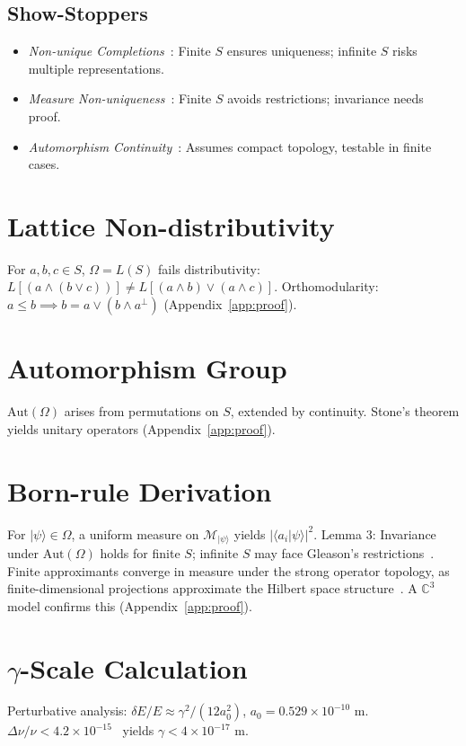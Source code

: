 \documentclass[aps,prx,twocolumn]{revtex4-2}
\begin{document}
\subsection{Show-Stoppers}
\begin{itemize}
    \item \emph{Non-unique Completions}~\cite{piron1976}: Finite $S$ ensures uniqueness; infinite $S$ risks multiple representations.
    \item \emph{Measure Non-uniqueness}~\cite{gleason1975}: Finite $S$ avoids restrictions; invariance needs proof.
    \item \emph{Automorphism Continuity}~\cite{sternberg1959}: Assumes compact topology, testable in finite cases.
\end{itemize}

\begin{widetext}
\begin{appendix}

\section{Lattice Non-distributivity}
\label{app:lattice}
For $a, b, c \in S$, $\Omega = L(S)$ fails distributivity: $L[(a \land (b \lor c))] \neq L[(a \land b) \lor (a \land c)]$. Orthomodularity: $a \leq b \implies b = a \vee (b \wedge a^\perp)$ (Appendix~\ref{app:proof}).

\section{Automorphism Group}
\label{app:automorph}
$\mathrm{Aut}(\Omega)$ arises from permutations on $S$, extended by continuity. Stone’s theorem yields unitary operators (Appendix~\ref{app:proof}).

\section{Born-rule Derivation}
\label{app:born}
For $|\psi\rangle \in \Omega$, a uniform measure on $\mathcal{M}_{|\psi\rangle}$ yields $|\langle a_i | \psi \rangle|^2$. Lemma 3: Invariance under $\mathrm{Aut}(\Omega)$ holds for finite $S$; infinite $S$ may face Gleason’s restrictions~\cite{gleason1975}. Finite approximants converge in measure under the strong operator topology, as finite-dimensional projections approximate the Hilbert space structure~\cite{reed1980}. A $\mathbb{C}^3$ model confirms this (Appendix~\ref{app:proof}).

\section{\texorpdfstring{$\gamma$}{Gamma}-Scale Calculation}
\label{app:gamma}
Perturbative analysis: $\delta E/E \approx \gamma^2/(12 a_0^2)$, $a_0 = 0.529 \times 10^{-10}$ m. $\Delta\nu/\nu < 4.2 \times 10^{-15}$~\cite{parthey2011} yields $\gamma < 4 \times 10^{-17}$ m.


\end{appendix}
\end{widetext}
\end{document}
